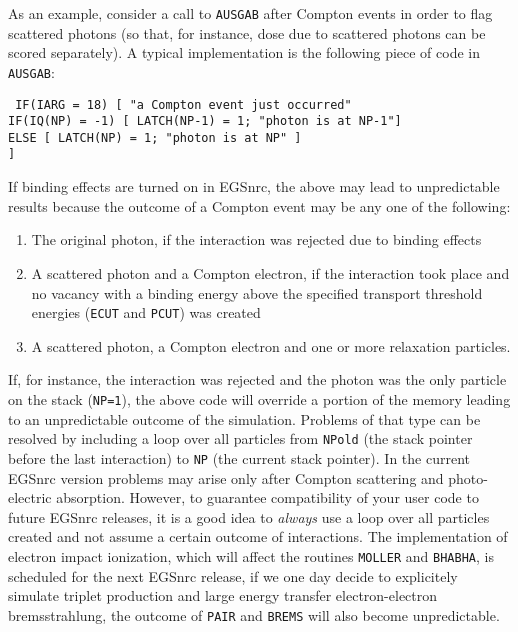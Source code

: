 As an example, consider 
a call to {\tt AUSGAB} after Compton 
events in order to flag scattered photons 
(so that, for instance, dose due to scattered photons can 
be scored separately).  A typical implementation is the 
following piece of code in {\tt AUSGAB}:
\begin{flushleft}{\tt
IF(IARG = 18) [ "a Compton event just occurred"\\
\quad IF(IQ(NP) = -1) [ LATCH(NP-1) = 1; "photon is at NP-1"] \\
\quad ELSE [ LATCH(NP) = 1; "photon is at NP" ] \\
] }
\end{flushleft}

\noindent
If binding effects are turned on in EGSnrc, the 
above may lead to unpredictable results because the 
outcome of a Compton event may be any one of the 
following:
\begin{enumerate}
\item
The original photon, if the interaction was rejected 
due to binding effects
\item
A scattered photon and a Compton electron, if the 
interaction took place and no vacancy with a binding 
energy above the specified transport threshold energies 
({\tt ECUT} and {\tt PCUT}) was created 
\item
A scattered photon, a Compton electron and one or more 
relaxation particles.
\end{enumerate}
If, for instance, the interaction was rejected and the photon 
was the only particle on the stack ({\tt NP=1}), the 
above code will override a portion of the memory 
leading to an unpredictable outcome of the simulation. 
Problems of that type can be resolved by including 
a loop over all particles from {\tt NPold} (the stack pointer 
before the last interaction) to {\tt NP} (the current stack 
pointer). In the current EGSnrc version problems may arise 
only after Compton scattering and photo-electric absorption. 
However, to guarantee compatibility of your user code 
to future EGSnrc releases, it is a good idea to 
{\em always} use a loop over all particles created 
and not assume a certain outcome of interactions. 
The implementation of electron impact ionization, which 
will affect the routines {\tt MOLLER} and {\tt BHABHA}, is scheduled 
for the next EGSnrc release, 
if we one day decide to explicitely simulate triplet 
production and large energy transfer electron-electron bremsstrahlung, 
the outcome of {\tt PAIR} and {\tt BREMS} will also become unpredictable. 

